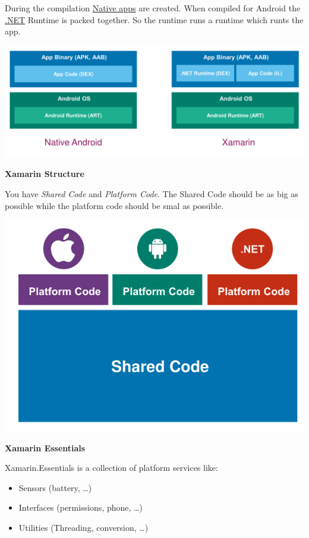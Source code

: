 \documentclass[10pt,twoside,landscape]{article}
\begin{document}
\begin{multicols}{3}
During the compilation \href{../../../roam/20210921091753-native_apps.org}{Native apps} are created.
When compiled for Android the \href{../../../roam/20211003114703-net.org}{.NET} Runtime is packed together.
So the runtime runs a runtime which runts the app.


\begin{center}
\includegraphics[width=.9\linewidth]{img/xamarin_native_android.png}
\end{center}

\textbf{Xamarin Structure}

You have \emph{Shared Code} and \emph{Platform Code}.
The Shared Code should be as big as possible while the platform code should be smal as possible.


\begin{center}
\includegraphics[width=.9\linewidth]{img/shared_platform_code.png}
\end{center}

\textbf{Xamarin Essentials}

Xamarin.Essentials is a collection of platform services like:
\begin{itemize}
\item Sensors (battery, \ldots{})
\item Interfaces (permissions, phone, \ldots{})
\item Utilities (Threading, conversion, \ldots{})
\end{itemize}



\end{multicols}
\end{document}
